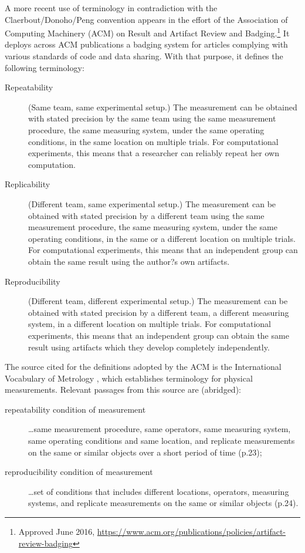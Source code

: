\documentclass{statement}
\newlength{\up}
\begin{document}
A more recent use of terminology in contradiction with the Claerbout/Donoho/Peng convention appears in the effort of the Association of Computing Machinery (ACM) on Result and Artifact Review and Badging.\footnote{ Approved June 2016, \url{https://www.acm.org/publications/policies/artifact-review-badging}}  It deploys across ACM publications a badging system for articles complying with various standards of code and data sharing. With that purpose, it defines the following terminology:
\vspace{\up}
\begin{description}
\item[Repeatability ]  (Same team, same experimental setup.)
The measurement can be obtained with stated precision by the same team using the same measurement procedure, the same measuring system, under the same operating conditions, in the same location on multiple trials. For computational experiments, this means that a researcher can reliably repeat her own computation.
\item[Replicability ] (Different team, same experimental setup.)
The measurement can be obtained with stated precision by a different team using the same measurement procedure, the same measuring system, under the same operating conditions, in the same or a different location on multiple trials. For computational experiments, this means that an independent group can obtain the same result using the author?s own artifacts.
\item[Reproducibility] (Different team, different experimental setup.)
The measurement can be obtained with stated precision by a different team, a different measuring system, in a different location on multiple trials. For computational experiments, this means that an independent group can obtain the same result using artifacts which they develop completely independently.
\end{description}


The source cited for the definitions adopted by the ACM is the International Vocabulary of Metrology \cite[]{jcgm2008}, which establishes terminology for physical measurements. 
Relevant passages from this source are (abridged):
\begin{description}
\item[repeatability condition of measurement]\ldots same measurement procedure, same operators, same measuring system, same operating conditions and same location, and replicate measurements on the same or similar objects over a short period of time (p.23);
\item[reproducibility condition of measurement]\ldots set of conditions that includes different locations, operators, measuring systems, and replicate measurements on the same or similar objects (p.24).
\end{description}
\end{document}
